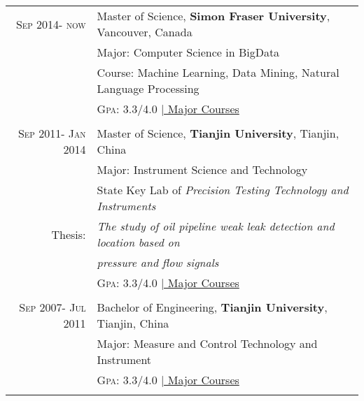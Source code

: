 \documentclass[a4paper,10pt]{article} %
\begin{document}
\begin{tabular}{rl}	
\textsc{Sep} 2014- \textsc{now} & Master of Science, \textbf{Simon Fraser University}, Vancouver, Canada\\
& Major: Computer Science in BigData\\
& Course: Machine Learning, Data Mining, Natural Language Processing \\

&\normalsize \textsc{Gpa}: 3.3/4.0 \hyperlink{grds}{\hfill | \footnotesize Major Courses}\\

&\\

\textsc{Sep} 2011- \textsc{Jan} 2014 & Master of Science, \textbf{Tianjin University}, Tianjin, China\\
& Major: Instrument Science and Technology\\
& State Key Lab of \emph{Precision Testing Technology and Instruments}\\
Thesis: &\emph{The study of oil pipeline weak leak detection and location based on}\\
& \emph{pressure and flow signals}\\
&\normalsize \textsc{Gpa}: 3.3/4.0 \hyperlink{grds}{\hfill | \footnotesize Major Courses}\\

&\\


\textsc{Sep} 2007- \textsc{Jul} 2011& Bachelor of Engineering, \textbf{ Tianjin University}, Tianjin, China\\
& Major: Measure and Control Technology and Instrument  \\
&\normalsize \textsc{Gpa}: 3.3/4.0 \hyperlink{grds_under}{\hfill| \footnotesize Major Courses}\\
&\\


\end{tabular}







\end{document}
